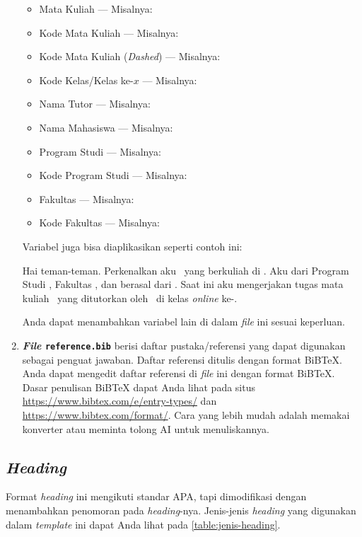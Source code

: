 \begin{enumerate}[]
\begin{itemize}[nosep]
        \item Mata Kuliah --- Misalnya: \namaMataKuliah
        \item Kode Mata Kuliah --- Misalnya: \kodeMataKuliah
        \item Kode Mata Kuliah (\textit{Dashed}) --- Misalnya: \KodeMataKuliah
        \item Kode Kelas/Kelas ke-$x$ --- Misalnya: \kodeKelas
        \item Nama Tutor --- Misalnya: \namaTutorPengampu
        \item Nama Mahasiswa --- Misalnya: \namaMahasiswa
        \item Program Studi --- Misalnya: \programStudi
        \item Kode Program Studi --- Misalnya: \kodeProgramStudi
        \item Fakultas --- Misalnya: \fakultas
        \item Kode Fakultas --- Misalnya: \kodeFakultas
    \end{itemize}
    
    Variabel juga bisa diaplikasikan seperti contoh ini:
    
    Hai teman-teman. Perkenalkan aku \namaMahasiswa\ yang berkuliah di \perguruanTinggi. Aku dari Program Studi \programStudi, Fakultas \fakultas, dan berasal dari \utDaerah. Saat ini aku mengerjakan tugas mata kuliah \namaMataKuliah\ yang ditutorkan oleh \namaTutorPengampu\ di kelas \textit{online} ke-\kodeKelas.
    
    Anda dapat menambahkan variabel lain di dalam \textit{file} ini sesuai keperluan.
    
    \item \textbf{\textit{File} \texttt{reference.bib}} berisi daftar pustaka/referensi yang dapat digunakan sebagai penguat jawaban. Daftar referensi ditulis dengan format BiBTeX. Anda dapat mengedit daftar referensi di \textit{file} ini dengan format BiBTeX. Dasar penulisan BiBTeX dapat Anda lihat pada situs \url{https://www.bibtex.com/e/entry-types/} dan \url{https://www.bibtex.com/format/}. Cara yang lebih mudah adalah memakai konverter atau meminta tolong AI untuk menuliskannya.
\end{enumerate}

\subsection{\textit{Heading}}

Format \textit{heading} ini mengikuti standar APA, tapi dimodifikasi dengan menambahkan penomoran pada \textit{heading}-nya. Jenis-jenis \textit{heading} yang digunakan dalam \textit{template} ini dapat Anda lihat pada \autoref{table:jenis-heading}.


